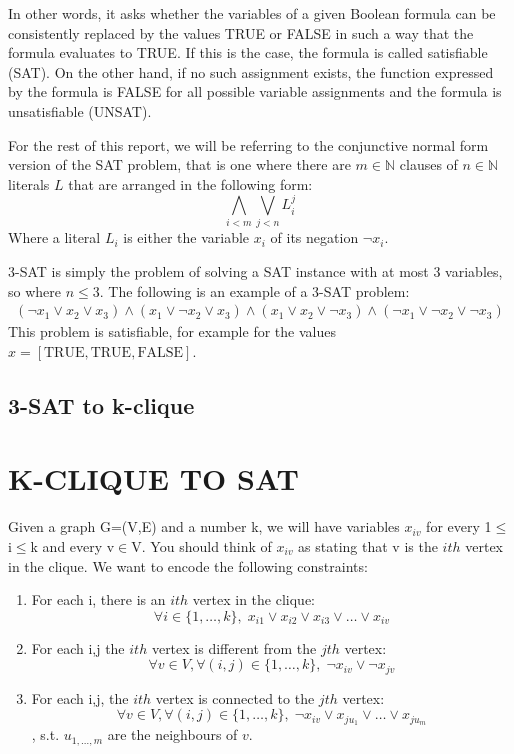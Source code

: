 \documentclass[table]{article}
\newcommand{\TRUE}{\text{TRUE}}
\newcommand{\FALSE}{\text{FALSE}}
\begin{document}
In other words, it asks whether the variables of a given Boolean formula can be consistently replaced by the values TRUE or FALSE in such a way that the formula evaluates to TRUE. If this is the case, the formula is called satisfiable (SAT). On the other hand, if no such assignment exists, the function expressed by the formula is FALSE for all possible variable assignments and the formula is unsatisfiable (UNSAT).

For the rest of this report, we will be referring to the conjunctive normal form version of the SAT problem, that is one where there are $m\in\mathbb{N}$ clauses of $n\in\mathbb{N}$ literals $L$ that are arranged in the following form:
\[ \bigwedge_{i<m}\bigvee_{j<n}L_i^j \]
Where a literal $L_i$ is either the variable $x_i$ of its negation $\neg x_i$.

3-SAT is simply the problem of solving a SAT instance with at most 3 variables, so where $n\leq3$. The following is an example of a 3-SAT problem:
\begin{align*}
    (\neg x_1 \lor x_2 \lor x_3)\land(x_1 \lor \neg x_2 \lor x_3)\land(x_1 \lor x_2 \lor \neg x_3)\land(\neg x_1 \lor \neg x_2 \lor \neg x_3)
\end{align*}
This problem is satisfiable, for example for the values $x = [\TRUE, \TRUE, \FALSE]$. 
\subsection{3-SAT to k-clique}
\leftskip=0.0in 
\section{K-CLIQUE TO SAT}

\leftskip=0.5in 
Given a graph G=(V,E) and a number k, we will have variables $x_{iv}$ for every 1$\leq$i$\leq$k and every v$\in$V. You should think of $x_{iv}$ as stating that v is the $ith$ vertex in the clique. We want to encode the following constraints:

\begin{enumerate}\leftskip=0.8in 
\item 	For each i, there is an $ith$ vertex in the clique: \[\forall i\in \{1,\dots,k\}, \; x_{i1} \lor x_{i2} \lor x_{i3} \lor \dots \lor x_{iv}\]
\item   For each i,j the $ith$ vertex is different from the $jth$ vertex: \[\forall v\in V, \forall(i,j)\in \{1,\dots,k\}, \; \neg x_{iv} \lor \neg x_{jv}\]
\item 	For each i,j, the $ith$ vertex is connected to the $jth$ vertex: \[\forall v\in V, \forall(i,j)\in \{1,\dots,k\}, \; \neg x_{iv} \lor x_{ju_1} \lor \dots \lor x_{ju_m}\], s.t. $u_{1,\dots,m}$ are the neighbours of $v$.
\end{enumerate}
\end{document}
